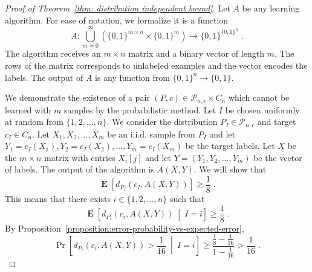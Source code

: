 \documentclass[11pt]{article}
\renewcommand{\P}{\mathcal{P}}
\DeclareMathOperator{\Exp}{\mathbf{E}}
\begin{document}
\begin{proof}[Proof of Theorem~\ref{thm: distribution independent bound}]
Let $A$ be any learning algorithm. For ease of notation, we formalize it is a function
$$
A:\bigcup_{m=0}^\infty \left(\{0,1\}^{m \times n} \times \{0,1\}^m\right) \to \{0,1\}^{\{0,1\}^n} \; .
$$
The algorithm receives an $m \times n$ matrix and a binary vector of length $m$.
The rows of the matrix corresponds to unlabeled examples and the vector encodes
the labels. The output of $A$ is any function from $\{0,1\}^n \to \{0,1\}$.

We demonstrate the existence of a pair $(P,c) \in \P_{n,\epsilon} \times C_n$ which
cannot be learned with $m$ samples by the probabilistic method. Let $I$ be chosen
uniformly at random from $\{1,2,\dots,n\}$. We consider the distribution $P_I \in
\P_{n,\epsilon}$ and target $c_I \in C_n$. Let $X_1, X_2, \dots, X_m$ be an i.i.d.
sample from $P_I$ and let $Y_1 = c_I(X_1), Y_2 = c_I(X_2), \dots, Y_m =
c_I(X_m)$ be the target labels. Let $X$ be the $m \times n$ matrix with entries
$X_i[j]$ and let $Y = (Y_1, Y_2, \dots, Y_m)$ be the vector of labels. The
output of the algorithm is $A(X,Y)$. We will show that
\begin{equation}
\label{equation:projections-failure-probability}
\Exp \left[d_{P_I}(c_I, A(X,Y)) \right] \ge \frac{1}{8} \; .
\end{equation}
This means that there exists $i \in \{1,2,\dots,n\}$ such that
$$
\Exp \left[d_{P_i}(c_i, A(X,Y)) ~\middle|~ I = i \right] \ge \frac{1}{8} \; .
$$
By Proposition~\ref{proposition:error-probability-vs-expected-error},
$$
\Pr \left[ d_{P_i}(c_i, A(X,Y)) > \frac{1}{16} ~\middle|~ I = i \right] \ge \frac{\frac{1}{8} - \frac{1}{16}}{1 - \frac{1}{16}} > \frac{1}{16} \; .
$$


\end{proof}
\end{document}
